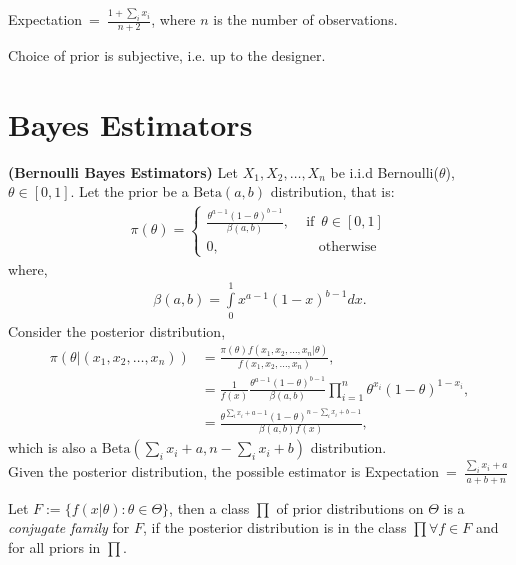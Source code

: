 \documentclass[12pt]{report}
\begin{document}
Expectation\,\,\,=\,\,\,$\displaystyle{\frac{1+\sum\limits_i {x_i}}{n+2}}$, where $n$ is the number of observations.\\

\begin{note}
 Choice of prior is subjective, i.e. up to the designer.
\end{note}

\vspace{2cm}

\section{Bayes Estimators}
\begin{exmp}\textbf{(Bernoulli Bayes Estimators)} Let $X_1,X_2,\dots,X_n$ be i.i.d Bernoulli($\theta$), $\theta \in [0,1]$. Let the prior be a $\mathrm{Beta}(a,b)$ distribution, that is:
\begin{align}
\pi(\theta) = 
\begin{cases}
 \displaystyle{\frac{\theta^{a-1}(1-\theta)^{b-1}}{\beta(a,b)}},       \,\,\,\,\,\,\,\mbox{if}\,\,\,\theta \in [0,1] \\
0,\hspace{85pt}\mbox{otherwise}
\end{cases}
\end{align} 
where,
\begin{align}
\beta(a,b) = \displaystyle{\int\limits_0^1 x^{a-1}(1-x)^{b-1}dx}.
\end{align}
Consider the posterior distribution,
\begin{align}
\pi(\theta|(x_1,x_2,\dots,x_n))&=\displaystyle{\frac{\pi(\theta)f(x_1,x_2,\dots,x_n|\theta)}{f(x_1,x_2,\dots,x_n)}},\\
&=\displaystyle{ \frac{1}{f(x)} \frac{\theta^{a-1}(1-\theta)^{b-1}}{\beta(a,b)} \prod\limits_{i=1}^n{\theta^{x_i}(1-\theta)^{1-x_i}}},\nonumber\\
&=\displaystyle{\frac{\theta^{\sum\limits_i {x_i}+a-1}(1-\theta)^{n-\sum\limits_i x_i +b-1}}{\beta(a,b)f(x)}},\nonumber
\end{align}
which is also a $\mathrm{Beta}\left(\sum\limits_i {x_i}+a,n-\sum\limits_i x_i +b\right)$ distribution.\\
Given the posterior distribution, the possible estimator is Expectation\,\,\,=\,\,\,$\displaystyle{\frac{\sum\limits_i {x_i}+a}{a+b+n}}$
\end{exmp}
\begin{defn}{Let $F:= \{f(x|\theta):\theta \in \Theta\}$, then a class $\prod$ of prior distributions on $\Theta$ is a \textit{conjugate family} for $F$, if the posterior distribution is in the class $\prod \forall f \in F$ and for all priors in $\prod$.}
\end{defn}
\end{document}
